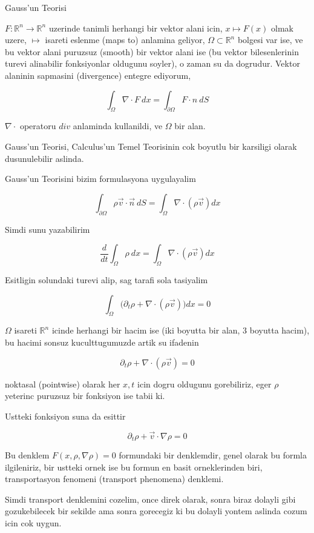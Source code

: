 \documentclass[12pt,fleqn]{article}
\begin{document}
Gauss'un Teorisi

$F: \mathbb{R}^n \to \mathbb{R}^n$ uzerinde tanimli herhangi bir vektor alani icin,
$x
\mapsto F(x)$ olmak uzere, $\mapsto$ isareti eslenme (maps to) anlamina
geliyor, $\Omega \subset \mathbb{R}^n$ bolgesi var ise, ve bu vektor alani
puruzsuz (smooth) bir vektor alani ise (bu vektor bilesenlerinin
turevi alinabilir fonksiyonlar oldugunu soyler), o zaman su da
dogrudur. Vektor alaninin sapmasini (divergence) entegre ediyorum, 

\[ 
\int_\Omega \nabla \cdot F \ dx =
\int_{\partial \Omega} F \cdot n \ dS
\]


$\nabla \cdot$ operatoru $div$ anlaminda kullanildi, ve $\Omega$ bir alan. 

Gauss'un Teorisi, Calculus'un Temel Teorisinin cok boyutlu bir karsiligi
olarak dusunulebilir aslinda.

Gauss'un Teorisini bizim formulasyona uygulayalim

\[ \int_{\partial \Omega} \rho \vec{v} \cdot \vec{n} \ dS =
\int_\Omega \nabla \cdot (\rho \vec{v}) dx 
\]

Simdi sunu yazabilirim

\[ \frac{d}{dt} \int_\Omega \rho \ dx = 
\int_\Omega \nabla \cdot (\rho \vec{v}) dx
 \]

Esitligin solundaki turevi alip, sag tarafi sola tasiyalim

\[ \int_\Omega \bigg( 
\partial_t \rho + \nabla \cdot (\rho \vec{v}) 
\bigg)dx = 0
 \]

$\Omega$ isareti $\mathbb{R}^n$ icinde herhangi bir hacim ise (iki boyutta bir
alan, 3 boyutta hacim), bu hacimi sonsuz kuculttugumuzde artik su ifadenin 

\[ \partial_t \rho + \nabla \cdot (\rho \vec{v})  = 0 \]

noktasal (pointwise) olarak her $x,t$ icin dogru oldugunu gorebiliriz, eger
$\rho$ yeterinc puruzsuz bir fonksiyon ise tabii ki. 

Ustteki fonksiyon suna da esittir

\[ \partial_t \rho + \vec{v} \cdot \nabla \rho = 0\]

Bu denklem $F(x,\rho,\nabla \rho)=0$ formundaki bir denklemdir, genel
olarak bu formla ilgileniriz, bir ustteki ornek ise bu formun en basit
orneklerinden biri, transportasyon fenomeni (transport phenomena) denklemi.

Simdi transport denklemini cozelim, once direk olarak, sonra biraz dolayli
gibi gozukebilecek bir sekilde ama sonra gorecegiz ki bu dolayli yontem
aslinda cozum icin cok uygun. 
\end{document}
